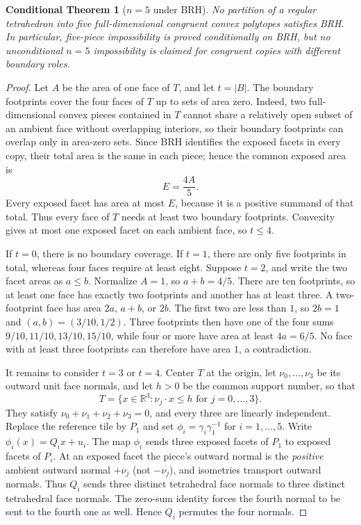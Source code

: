 \documentclass[11pt,a4paper]{article}
\theoremstyle{plain}
\newtheorem{conditionaltheorem}[conditionaltheorem]{Conditional Theorem}
\theoremstyle{definition}
\theoremstyle{remark}
\begin{document}
\begin{conditionaltheorem}[$n=5$ under BRH]\label{thm:n5}
No partition of a regular tetrahedron into five full-dimensional congruent
convex polytopes satisfies BRH.  In particular, five-piece impossibility is
proved conditionally on BRH, but no unconditional $n=5$ impossibility is
claimed for congruent copies with different boundary roles.
\end{conditionaltheorem}

\begin{proof}
Let $A$ be the area of one face of $T$, and let $t=|B|$.  The boundary
footprints cover the four faces of $T$ up to sets of area zero.  Indeed, two
full-dimensional convex pieces contained in $T$ cannot share a relatively
open subset of an ambient face without overlapping interiors, so their
boundary footprints can overlap only in area-zero sets.  Since BRH identifies
the exposed facets in every copy, their total area is the same in each piece;
hence the common exposed area is
\begin{equation}\label{eq:brh-exposed-area}
 E=\frac{4A}{5}.
\end{equation}
Every exposed facet has area at most $E$, because it is a positive summand of
that total.  Thus every face of $T$ needs at least two boundary footprints.
Convexity gives at most one exposed facet on each ambient face, so $t\le4$.

If $t=0$, there is no boundary coverage.  If $t=1$, there are only five
footprints in total, whereas four faces require at least eight.  Suppose
$t=2$, and write the two facet areas as $a\le b$.  Normalize $A=1$, so
$a+b=4/5$.  There are ten footprints, so at least one face has exactly two
footprints and another has at least three.  A two-footprint face has area
$2a$, $a+b$, or $2b$.  The first two are less than $1$, so $2b=1$ and
$(a,b)=(3/10,1/2)$.  Three footprints then have one of the four sums
$9/10,11/10,13/10,15/10$, while four or more have area at least
$4a=6/5$.  No face with at least three footprints can therefore have area
$1$, a contradiction.

It remains to consider $t=3$ or $t=4$.  Center $T$ at the origin, let
$\nu_0,\ldots,\nu_3$ be its outward unit face normals, and let $h>0$ be
the common support number, so that
\[
 T=\{x\in\mathbb R^3:\nu_j\cdot x\le h\text{ for }j=0,\ldots,3\}.
\]
They satisfy
$\nu_0+\nu_1+\nu_2+\nu_3=0$, and every three are linearly independent.
Replace the reference tile by $P_1$ and set
$\phi_i=\gamma_i\gamma_1^{-1}$ for $i=1,\ldots,5$.  Write
$\phi_i(x)=Q_i x+u_i$.  The map $\phi_i$ sends three exposed facets of
$P_1$ to exposed facets of $P_i$.  At an exposed facet the piece's outward
normal is the \emph{positive} ambient outward normal $+\nu_j$ (not $-\nu_j$),
and isometries transport outward normals.  Thus $Q_i$ sends three distinct tetrahedral face normals to three
distinct tetrahedral face normals.  The zero-sum identity
forces the fourth normal to be sent to the fourth one as well.  Hence $Q_i$
permutes the four normals.


\end{proof}
\end{document}
